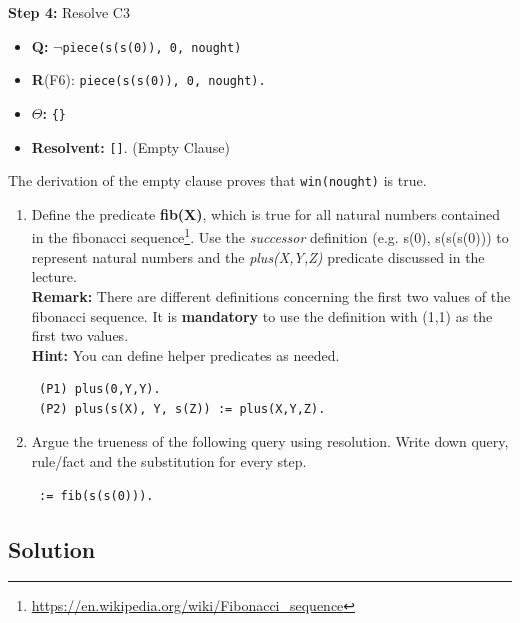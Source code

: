 \documentclass[10pt, a4paper]{article}
\begin{document}
\textbf{Step 4:} Resolve C3
\begin{itemize}
    \item \textbf{Q:} \texttt{$\lnot$piece(s(s(0)), 0, nought)}
    \item \textbf{R}(F6): \texttt{piece(s(s(0)), 0, nought).}
    \item \textbf{$\Theta$:} \texttt{\{\}}
    \item \textbf{Resolvent:} \texttt{[]}. (Empty Clause)
\end{itemize}

The derivation of the empty clause proves that \texttt{win(nought)} is true.

\pagebreak
\begin{enumerate}
\item Define the predicate \textbf{fib(X)}, which is true for all natural numbers contained in the fibonacci sequence\footnote{\url{https://en.wikipedia.org/wiki/Fibonacci_sequence}}. Use the \textit{successor} definition (e.g. s(0), s(s(s(0))) to represent natural numbers and the \textit{plus(X,Y,Z)} predicate discussed in the lecture.\\
\textbf{Remark:} There are different definitions concerning the first two values of the fibonacci sequence. It is \textbf{mandatory} to use the definition with (1,1) as the first two values.\\
\textbf{Hint:} You can define helper predicates as needed.

\begin{verbatim}
 (P1) plus(0,Y,Y).
 (P2) plus(s(X), Y, s(Z)) := plus(X,Y,Z).
\end{verbatim}
\item Argue the trueness of the following query using resolution. Write down query, rule/fact and the substitution for every step.
\begin{verbatim}
 := fib(s(s(0))).
\end{verbatim}
\end{enumerate}

\subsection*{Solution}

\setcounter{subsubsection}{0}
\end{document}
